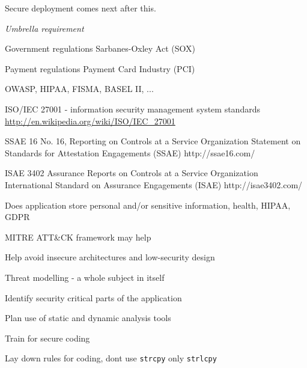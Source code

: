 \documentclass[Screen16to9,17pt]{foils}
\begin{document}
Secure deployment comes next after this.


\begin{list2}
\item \emph{Umbrella requirement}
\item Government regulations Sarbanes-Oxley Act (SOX)
\item Payment regulations Payment Card Industry (PCI)
\item OWASP, HIPAA, FISMA, BASEL II, ...
\item ISO/IEC 27001 - information security management system standards
\url{http://en.wikipedia.org/wiki/ISO/IEC_27001}
\item SSAE 16 No. 16, Reporting on Controls at a Service Organization
Statement on Standards for Attestation Engagements (SSAE) http://ssae16.com/
\item ISAE 3402 Assurance Reports on Controls at a Service Organization
International Standard on Assurance Engagements (ISAE) http://isae3402.com/
\end{list2}






\begin{list2}
\item Does application store personal and/or sensitive information, health, HIPAA, GDPR
\item MITRE ATT\&CK framework may help 
\end{list2}


\begin{list2}
\item Help avoid insecure architectures and low-security design
\item Threat modelling - a whole subject in itself
\item Identify security critical parts of the application
\end{list2}


\begin{list2}
\item Plan use of static and dynamic analysis tools
\item Train for secure coding
\item Lay down rules for coding, dont use \verb+strcpy+ only \verb+strlcpy+
\end{list2}
\end{document}

